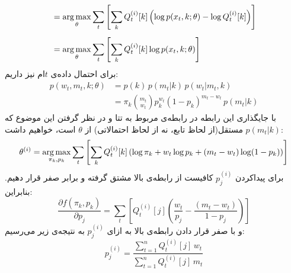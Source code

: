 \documentclass[a4paper, 12pt]{article}
\begin{document}
\begin{enumerate}
\[\begin{aligned}
		&= \operatorname*{arg\,max}_\theta \sum_t\left[\sum_k Q_t^{(i)}[k] \left(\log p(x_t, k; \theta) - \log Q_t^{(i)}[k]\right)\right] \\[0.5em]
		&= \operatorname*{arg\,max}_\theta \sum_t \left[\sum_k Q_t^{(i)}[k] \log p(x_t, k; \theta)\right]
	\end{aligned}
	\]
	برای احتمال داده‌ی $t$ام نیز داریم:
	\[
	\begin{aligned}
		p(w_t, m_t, k; \theta) &= p(k)\,p(m_t|k)\,p(w_t|m_t, k) \\[0.5em]
		&= \pi_k \binom{m_t}{w_t} p_k^{w_t}(1-p_k)^{m_t-w_t}\,p(m_t|k)		
	\end{aligned}
	\]
	با جایگذاری این رابطه در رابطه‌ی مربوط به تتا و در نظر گرفتن این موضوع که $p(m_t|k)$ مستقل(از لحاظ تابع، نه از لحاظ احتمالاتی) از $\theta$ است، خواهیم داشت:
	\[
	\theta^{(i)} = \operatorname*{arg\,max}_{\pi_k, p_k} \sum_t\left[\sum_k Q_t^{(i)}[k] \left(\log \pi_k + w_t\log p_k + (m_t-w_t)\log(1-p_k)\right) \right]
	\]
	برای پیداکردن
	$p_j^{(i)}$
	کافیست از رابطه‌ی بالا مشتق گرفته و برابر صفر قرار دهیم. بنابراین:
	\[
	\frac{\partial f(\pi_k, p_k)}{\partial p_j} = \sum_t\left[Q_t^{(i)}[j] \left(\frac{w_t}{p_j} - \frac{(m_t-w_t)}{1-p_j}\right)\right]
	\]
	و با صفر قرار دادن رابطه‌ی بالا به ازای
	$p_j^{(i)}$
	به نتیجه‌ی زیر می‌رسیم:
	\[
	\boxed{p_j^{(i)} = \frac{\sum_{t=1}^n Q_t^{(i)}[j]\,w_t}{\sum_{t=1}^n Q_t^{(i)}[j]\,m_t}}
	\]
\end{enumerate}

\pagebreak
\end{document}
